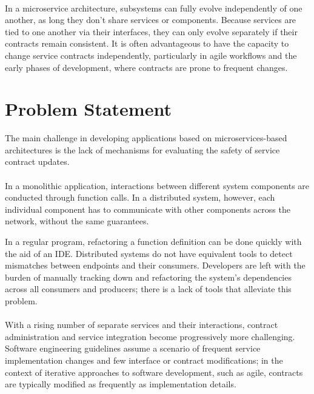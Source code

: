 \paragraph{}

In a microservice architecture, subsystems can fully evolve independently of one another, as long they don't share services or components.
Because services are tied to one another via their interfaces, they can only evolve separately if their contracts remain consistent.
It is often advantageous to have the capacity to change service contracts independently,
particularly in agile workflows and the early phases of development, where contracts are prone to frequent changes.

\section{Problem Statement} %
\label{sec:problem_statement}

The main challenge in developing applications based on microservices-based architectures is the lack of mechanisms for evaluating the safety of service contract updates.

\paragraph{}

In a monolithic application, interactions between different system components are conducted through function calls.
In a distributed system, however, each individual component has to communicate with other components across the network,
without the same guarantees.

In a regular program, refactoring a function definition can be done quickly with the aid of an IDE.
Distributed systems do not have equivalent tools to detect mismatches between endpoints and their consumers.
Developers are left with the burden of manually tracking down and refactoring the system's dependencies across all consumers and producers;
there is a lack of tools that alleviate this problem.

\paragraph{}

With a rising number of separate services and their interactions, contract administration and service integration become progressively more challenging.
Software engineering guidelines assume a scenario of frequent service implementation changes and few interface or contract modifications;
in the context of iterative approaches to software development, such as agile, contracts are typically modified as frequently as implementation details.

